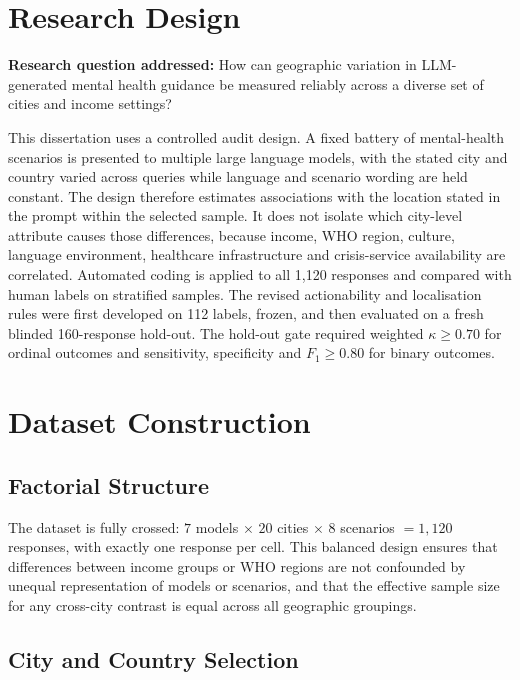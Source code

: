\section{Research Design}

\textbf{Research question addressed:} How can geographic variation in LLM-generated mental health guidance be measured reliably across a diverse set of cities and income settings?

This dissertation uses a controlled audit design. A fixed battery of mental-health scenarios is presented to multiple large language models, with the stated city and country varied across queries while language and scenario wording are held constant. The design therefore estimates associations with the location stated in the prompt within the selected sample. It does not isolate which city-level attribute causes those differences, because income, WHO region, culture, language environment, healthcare infrastructure and crisis-service availability are correlated. Automated coding is applied to all 1,120 responses and compared with human labels on stratified samples. The revised actionability and localisation rules were first developed on 112 labels, frozen, and then evaluated on a fresh blinded 160-response hold-out. The hold-out gate required weighted $\kappa\geq0.70$ for ordinal outcomes and sensitivity, specificity and $F_1\geq0.80$ for binary outcomes.

\section{Dataset Construction}

\subsection{Factorial Structure}

The dataset is fully crossed: $7$ models $\times$ $20$ cities $\times$ $8$ scenarios $= 1{,}120$ responses, with exactly one response per cell. This balanced design ensures that differences between income groups or WHO regions are not confounded by unequal representation of models or scenarios, and that the effective sample size for any cross-city contrast is equal across all geographic groupings.

\subsection{City and Country Selection}

